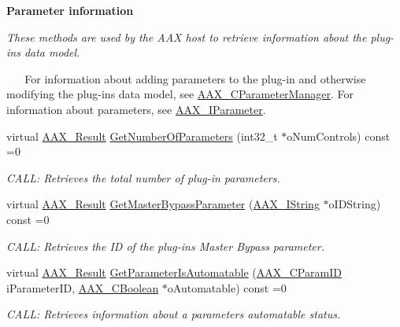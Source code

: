 \begin{Indent}\textbf{ Parameter information}\par
{\em These methods are used by the A\+AX host to retrieve information about the plug-\/in\textquotesingle{}s data model.

~\newline
 ~\newline
 For information about adding parameters to the plug-\/in and otherwise modifying the plug-\/in\textquotesingle{}s data model, see \mbox{\hyperlink{a01545}{A\+A\+X\+\_\+\+C\+Parameter\+Manager}}. For information about parameters, see \mbox{\hyperlink{a01857}{A\+A\+X\+\_\+\+I\+Parameter}}. }\begin{DoxyCompactItemize}
\item 
virtual \mbox{\hyperlink{a00392_a4d8f69a697df7f70c3a8e9b8ee130d2f}{A\+A\+X\+\_\+\+Result}} \mbox{\hyperlink{a01669_a8af398b1e308849464aee5a6713a3965}{Get\+Number\+Of\+Parameters}} (int32\+\_\+t $\ast$o\+Num\+Controls) const =0
\begin{DoxyCompactList}\small\item\em C\+A\+LL\+: Retrieves the total number of plug-\/in parameters. \end{DoxyCompactList}\item 
virtual \mbox{\hyperlink{a00392_a4d8f69a697df7f70c3a8e9b8ee130d2f}{A\+A\+X\+\_\+\+Result}} \mbox{\hyperlink{a01669_ab967122337b61064492024f8bf695ed4}{Get\+Master\+Bypass\+Parameter}} (\mbox{\hyperlink{a01873}{A\+A\+X\+\_\+\+I\+String}} $\ast$o\+I\+D\+String) const =0
\begin{DoxyCompactList}\small\item\em C\+A\+LL\+: Retrieves the ID of the plug-\/in\textquotesingle{}s Master Bypass parameter. \end{DoxyCompactList}\item 
virtual \mbox{\hyperlink{a00392_a4d8f69a697df7f70c3a8e9b8ee130d2f}{A\+A\+X\+\_\+\+Result}} \mbox{\hyperlink{a01669_a4e6eeef25a797ea4c6961df45174b169}{Get\+Parameter\+Is\+Automatable}} (\mbox{\hyperlink{a00392_a1440c756fe5cb158b78193b2fc1780d1}{A\+A\+X\+\_\+\+C\+Param\+ID}} i\+Parameter\+ID, \mbox{\hyperlink{a00392_aa216506530f1d19a2965931ced2b274b}{A\+A\+X\+\_\+\+C\+Boolean}} $\ast$o\+Automatable) const =0
\begin{DoxyCompactList}\small\item\em C\+A\+LL\+: Retrieves information about a parameter\textquotesingle{}s automatable status. \end{DoxyCompactList}\item 

\end{DoxyCompactItemize}
\end{Indent}
